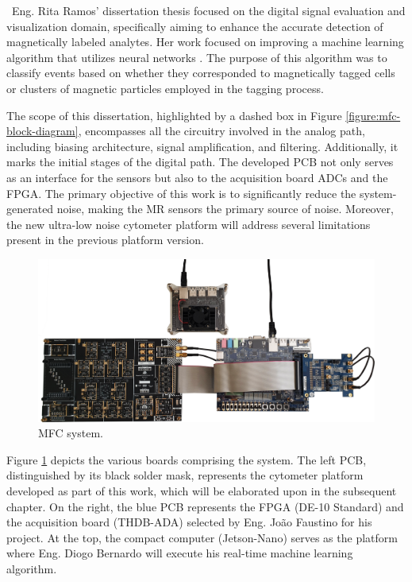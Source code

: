 \noindent
\textbullet \, Eng. Rita Ramos' dissertation thesis focused on the digital signal evaluation and visualization domain, specifically aiming to enhance the accurate detection of magnetically labeled analytes. Her work focused on improving a machine learning algorithm that utilizes neural networks \cite{10042449}. The purpose of this algorithm was to classify events based on whether they corresponded to magnetically tagged cells or clusters of magnetic particles employed in the tagging process.

The scope of this dissertation, highlighted by a dashed box in Figure \ref{figure:mfc-block-diagram}, encompasses all the circuitry involved in the analog path, including biasing architecture, signal amplification, and filtering. Additionally, it marks the initial stages of the digital path. The developed \ac{PCB} not only serves as an interface for the sensors but also to the acquisition board \ac{ADC}s and the \ac{FPGA}. The primary objective of this work is to significantly reduce the system-generated noise, making the \ac{MR} sensors the primary source of noise. Moreover, the new ultra-low noise cytometer platform will address several limitations present in the previous platform version.

\begin{figure}[!ht]
    \centering
    \includegraphics[width=.9\textwidth]{images/chapter_3/system.png}
    \caption{MFC system.}
    \label{figure:system}
\end{figure}

Figure \ref{figure:system} depicts the various boards comprising the system. The left \ac{PCB}, distinguished by its black solder mask, represents the cytometer platform developed as part of this work, which will be elaborated upon in the subsequent chapter. On the right, the blue \ac{PCB} represents the \ac{FPGA} (DE-10 Standard) and the acquisition board (THDB-ADA) selected by Eng. João Faustino for his project. At the top, the compact computer (Jetson-Nano) serves as the platform where Eng. Diogo Bernardo will execute his real-time machine learning algorithm.

